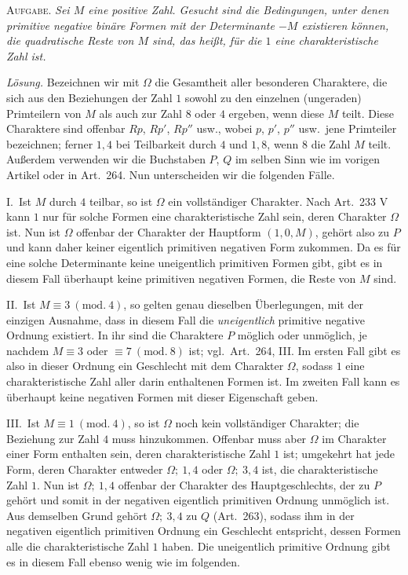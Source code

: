 \textsc{Aufgabe.} \textit{Sei $M$ eine positive Zahl. Gesucht sind
die Bedingungen, unter denen primitive negative binäre Formen mit der
Determinante $-M$ existieren können, die quadratische Reste von
$M$ sind, das heißt, für die $1$ eine charakteristische Zahl ist.}

\textit{Lösung.} Bezeichnen wir mit $\Omega$ die Gesamtheit aller
besonderen Charaktere, die sich aus den Beziehungen der Zahl $1$
sowohl zu den einzelnen (ungeraden) Primteilern von $M$ als auch
zur Zahl $8$ oder $4$ ergeben, wenn diese $M$ teilt.
Diese Charaktere sind offenbar $Rp$, $Rp'$, $Rp''$ usw., wobei
$p$, $p'$, $p''$ usw.\ jene Primteiler bezeichnen; ferner
$1,4$ bei Teilbarkeit durch $4$ und $1,8$, wenn $8$ die Zahl $M$
teilt. Außerdem verwenden wir die Buchstaben $P$, $Q$ im selben
Sinn wie im vorigen Artikel oder in Art.\ 264. Nun unterscheiden wir
die folgenden Fälle.

I.\ Ist $M$ durch $4$ teilbar, so ist $\Omega$ ein vollständiger
Charakter. Nach Art.\ 233 V kann $1$ nur für solche Formen eine
charakteristische Zahl sein, deren Charakter $\Omega$ ist. Nun ist
$\Omega$ offenbar der Charakter der Hauptform $(1,0,M)$, gehört also
zu $P$ und kann daher keiner eigentlich primitiven negativen
Form zukommen. Da es für eine solche Determinante keine uneigentlich
primitiven Formen gibt, gibt es in diesem Fall überhaupt keine primitiven
negativen Formen, die Reste von $M$ sind.

II.\ Ist $M\equiv3\ (\mathrm{mod.}\ 4)$, so gelten genau dieselben Überlegungen, mit der
einzigen Ausnahme, dass in diesem Fall die \textit{uneigentlich}
primitive negative Ordnung existiert. In ihr sind die Charaktere
$P$ möglich oder unmöglich, je nachdem $M\equiv3$ oder $\equiv7\ (\mathrm{mod.}\ 8)$
ist; vgl.\ Art.\ 264, III. Im ersten Fall gibt es also in dieser
Ordnung ein Geschlecht mit dem Charakter $\Omega$, sodass $1$
eine charakteristische Zahl aller darin enthaltenen Formen ist.
Im zweiten Fall kann es überhaupt keine negativen Formen mit dieser
Eigenschaft geben.

III.\ Ist $M\equiv1\ (\mathrm{mod.}\ 4)$, so ist $\Omega$ noch kein vollständiger Charakter;
die Beziehung zur Zahl $4$ muss hinzukommen. Offenbar muss aber
$\Omega$ im Charakter einer Form enthalten sein, deren charakteristische
Zahl $1$ ist; umgekehrt hat jede Form, deren Charakter entweder
$\Omega;\ 1,4$ oder $\Omega;\ 3,4$ ist, die charakteristische Zahl $1$.
Nun ist $\Omega;\ 1,4$ offenbar der Charakter des Hauptgeschlechts, der zu
$P$ gehört und somit in der negativen eigentlich primitiven
Ordnung unmöglich ist. Aus demselben Grund gehört $\Omega;\ 3,4$ zu $Q$
(Art.\ 263), sodass ihm in der negativen eigentlich primitiven Ordnung
ein Geschlecht entspricht, dessen Formen alle die charakteristische
Zahl $1$ haben. Die uneigentlich primitive Ordnung gibt es in
diesem Fall ebenso wenig wie im folgenden.

